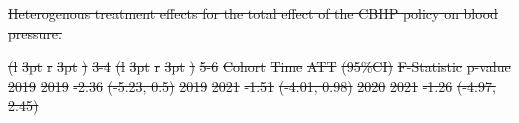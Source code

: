 \documentclass[
  letterpaper,
  DIV=11,
  numbers=noendperiod]{scrartcl}
\makeatletter
\renewenvironment{table}%
   {\renewcommand\familydefault\sfdefault
    \@float{table}}
   {\end@float}
\providecommand{\DIFdel}[1]{{\protect\color{red}\sout{#1}}}                      %
\providecommand{\DIFdelbegin}{} %
\providecommand{\DIFdelFL}[1]{\DIFdel{#1}} %
\providecommand{\DIFaddbeginFL}{} %
\providecommand{\DIFaddendFL}{} %
\providecommand{\DIFdelbeginFL}{} %
\providecommand{\DIFdelendFL}{} %
\newcommand{\DIFscaledelfig}{0.5}
\newlength{\DIFdelgraphicswidth} %
\newlength{\DIFdelgraphicsheight} %
\newcommand{\DIFaddincludegraphics}[2][]{{\color{blue}\fbox{\DIFOincludegraphics[#1]{#2}}}} %
\newcommand{\DIFdelincludegraphics}[2][]{%
\sbox{\DIFdelgraphicsbox}{\DIFOincludegraphics[#1]{#2}}%
\settoboxwidth{\DIFdelgraphicswidth}{\DIFdelgraphicsbox} %
\settoboxtotalheight{\DIFdelgraphicsheight}{\DIFdelgraphicsbox} %
\scalebox{\DIFscaledelfig}{%
\parbox[b]{\DIFdelgraphicswidth}{\usebox{\DIFdelgraphicsbox}\\[-\baselineskip] \rule{\DIFdelgraphicswidth}{0em}}\llap{\resizebox{\DIFdelgraphicswidth}{\DIFdelgraphicsheight}{%
\setlength{\unitlength}{\DIFdelgraphicswidth}%
\begin{picture}(1,1)%
\thicklines\linethickness{2pt} %
{\color[rgb]{1,0,0}\put(0,0){\framebox(1,1){}}}%
{\color[rgb]{1,0,0}\put(0,0){\line( 1,1){1}}}%
{\color[rgb]{1,0,0}\put(0,1){\line(1,-1){1}}}%
\end{picture}%
}\hspace*{3pt}}} %
} %
\DeclareRobustCommand{\DIFdelbegin}{\DIFOdelbegin \let\includegraphics\DIFdelincludegraphics} %
\DeclareRobustCommand{\DIFaddbeginFL}{\DIFOaddbeginFL \let\includegraphics\DIFaddincludegraphics} %
\DeclareRobustCommand{\DIFaddendFL}{\DIFOaddendFL \let\includegraphics\DIFOincludegraphics} %
\DeclareRobustCommand{\DIFdelbeginFL}{\DIFOdelbeginFL \let\includegraphics\DIFdelincludegraphics} %
\DeclareRobustCommand{\DIFdelendFL}{\DIFOaddendFL \let\includegraphics\DIFOincludegraphics} %
\makeatother
\begin{document}
\DIFdelbegin %
{%
\DIFdelFL{Heterogenous treatment effects for the total effect of the CBHP policy
on blood pressure. }}%
\DIFdelendFL \DIFaddbeginFL \begin{table}
\DIFaddendFL 

\DIFdelbeginFL %
\DIFdelFL{(l}%
\DIFdelFL{3pt}%
\DIFdelFL{r}%
\DIFdelFL{3pt}%
\DIFdelFL{)}%
\DIFdelFL{3-4}%
\DIFdelFL{(l}%
\DIFdelFL{3pt}%
\DIFdelFL{r}%
\DIFdelFL{3pt}%
\DIFdelFL{)}%
\DIFdelFL{5-6}%
\DIFdelFL{Cohort }%
\DIFdelFL{Time }%
\DIFdelFL{ATT }%
\DIFdelFL{(95\%CI) }%
\DIFdelFL{F-Statistic }%
\DIFdelFL{p-value}%
\DIFdelFL{\hspace{1em}2019 }%
\DIFdelFL{2019 }%
\DIFdelFL{-2.36 }%
\DIFdelFL{(-5.23, 0.5) }%
\DIFdelFL{\hspace{1em}2019 }%
\DIFdelFL{2021 }%
\DIFdelFL{-1.51 }%
\DIFdelFL{(-4.01, 0.98) }%
\DIFdelFL{\hspace{1em}2020 }%
\DIFdelFL{2021 }%
\DIFdelFL{-1.26 }%
\DIFdelFL{(-4.97, 2.45) }%

\end{table}
\end{document}
